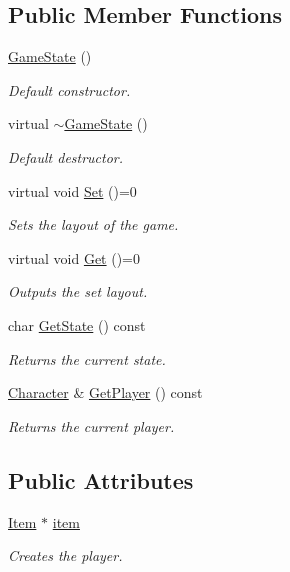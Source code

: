 \subsection*{Public Member Functions}
\begin{DoxyCompactItemize}
\item 
\hyperlink{classGameState_a4fa0a2bf50315c4a35a3890a0adcee5c}{Game\-State} ()
\begin{DoxyCompactList}\small\item\em Default constructor. \end{DoxyCompactList}\item 
virtual \hyperlink{classGameState_a517ef6eaba96896259fcefd0c66afc9e}{$\sim$\-Game\-State} ()
\begin{DoxyCompactList}\small\item\em Default destructor. \end{DoxyCompactList}\item 
virtual void \hyperlink{classGameState_af22e9a43999f99b784a35fab85cd9208}{Set} ()=0
\begin{DoxyCompactList}\small\item\em Sets the layout of the game. \end{DoxyCompactList}\item 
virtual void \hyperlink{classGameState_a4283cb3aa5637d4815d64272843a0625}{Get} ()=0
\begin{DoxyCompactList}\small\item\em Outputs the set layout. \end{DoxyCompactList}\item 
char \hyperlink{classGameState_a80d734fcbd886d8a0ce8e3191e770b3a}{Get\-State} () const 
\begin{DoxyCompactList}\small\item\em Returns the current state. \end{DoxyCompactList}\item 
\hyperlink{classCharacter}{Character} \& \hyperlink{classGameState_a3a5aed8186889abbce91973de7b9143c}{Get\-Player} () const 
\begin{DoxyCompactList}\small\item\em Returns the current player. \end{DoxyCompactList}\end{DoxyCompactItemize}
\subsection*{Public Attributes}
\begin{DoxyCompactItemize}
\item 
\hyperlink{classItem}{Item} $\ast$ \hyperlink{classGameState_a11e8a5472e771f3a2eb84d38a0a95a72}{item}
\begin{DoxyCompactList}\small\item\em Creates the player. \end{DoxyCompactList}\end{DoxyCompactItemize}

